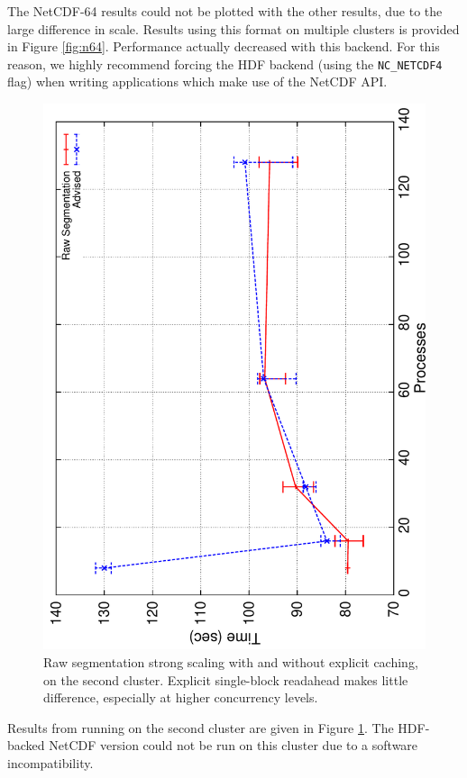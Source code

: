 The NetCDF-64 results could not be plotted with the other results, due
to the large difference in scale.  Results using this format on
multiple clusters is provided in Figure \ref{fig:n64}.  Performance
actually decreased with this backend.  For this reason, we highly
recommend forcing the HDF backend (using the \texttt{NC\_NETCDF4} flag)
when writing applications which make use of the NetCDF API.

\begin{figure}
  \centering
  \includegraphics[angle=270,width=\linewidth]{images/io/lh-most}
  \caption{Raw segmentation strong scaling with and without explicit
  caching, on the second cluster.  Explicit single-block readahead
  makes little difference, especially at higher concurrency levels.}
  \label{fig:lh-most}
\end{figure}

Results from running on the second cluster are given in Figure
\ref{fig:lh-most}.  The HDF-backed NetCDF version could not be run on
this cluster due to a software incompatibility.

